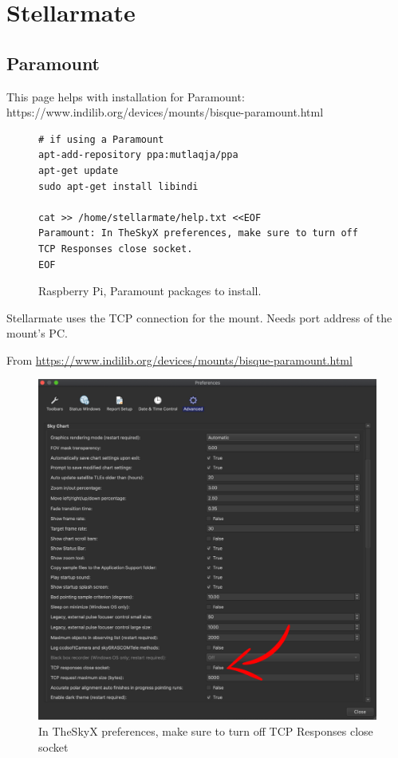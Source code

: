 \section{Stellarmate}

\subsection{Paramount}
This page helps with installation for Paramount:
https://www.indilib.org/devices/mounts/bisque-paramount.html

\begin{figure}[h!]
\centering
\begingroup \fontsize{10pt}{10pt}
\selectfont
\begin{verbatim} 
# if using a Paramount
apt-add-repository ppa:mutlaqja/ppa
apt-get update 
sudo apt-get install libindi

cat >> /home/stellarmate/help.txt <<EOF
Paramount: In TheSkyX preferences, make sure to turn off TCP Responses close socket.
EOF
\end{verbatim}
\endgroup
\caption{Raspberry Pi, Paramount packages to install.}
\label{figure:RaspberryPiParamount}
\end{figure}

Stellarmate uses the TCP connection for the mount. Needs port address of the mount's
PC.


From \url{https://www.indilib.org/devices/mounts/bisque-paramount.html}

\begin{figure}[h!]
\centering
\includegraphics[width=\textwidth]{images/smate_theskyx_config.png}
\caption[TheSkyX preferences]{In TheSkyX preferences, make sure to turn off TCP Responses close socket}
\label{figure:SmateTheskyxConfig}
\end{figure}

